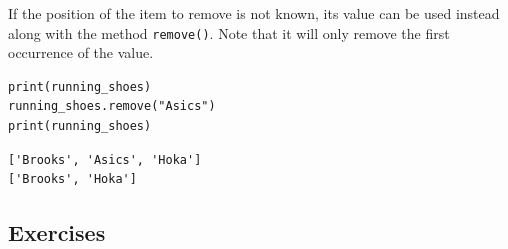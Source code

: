 \documentclass[10pt]{book}
\begin{document}
If the position of the item to remove is not known, its value can be used instead along with the method \texttt{remove()}. Note that it will only remove the first occurrence of the value.

\label{org48cc383}
\begin{verbatim}
print(running_shoes)
running_shoes.remove("Asics")
print(running_shoes)
\end{verbatim}

\label{orgf7711a2}
\begin{verbatim}
['Brooks', 'Asics', 'Hoka']
['Brooks', 'Hoka']
\end{verbatim}
\subsection{Exercises}
\label{sec:org989365b}
\end{document}

